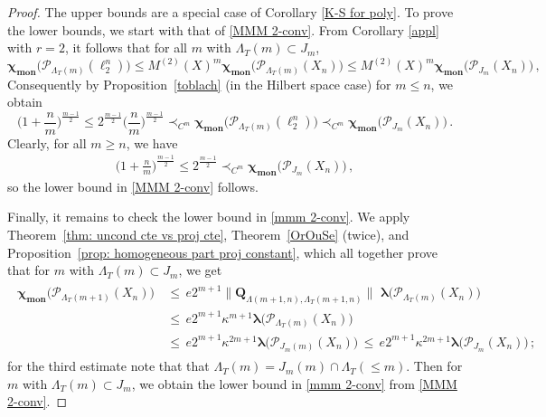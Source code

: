 \documentclass[12pt]{amsart}
\numberwithin{subsection}{section}
\theoremstyle{definition}
\theoremstyle{remark}
\DeclareMathOperator{\mon}{mon}
\newcommand{\chimon}{\chi_{\mon}}
\begin{document}
\begin{proof}
The upper bounds are a special case of Corollary \ref{K-S for poly}. To prove the lower bounds, we start with
that of \eqref{MMM 2-conv}.  From Corollary \ref{appl} with $r=2$, it follows that for all $m$
with $\Lambda_T(m) \subset J_m$,
\[
\boldsymbol{\chimon}\big(\mathcal{P}_{\Lambda_{T}(m)} (\ell_2^n)\big) \leq M^{(2)}(X)^m
\boldsymbol{\chimon}\big(\mathcal{P}_{\Lambda_{T}(m)}(X_n) \big) \leq M^{(2)}(X)^m \boldsymbol{\chimon}
\big(\mathcal{P}_{J_m}(X_n)\big)\,,
\]
Consequently by Proposition~\ref{toblach} (in the Hilbert space case) for $m\le n$, we obtain
\[
\Big( 1+ \frac{n}{m}\Big)^{\frac{m-1}{2}} \leq 2^{\frac{m-1}{2}} \Big(\frac{n}{m}\Big)^{\frac{m-1}{2}}
\prec_{C^m} \boldsymbol{\chimon} \big(\mathcal{P}_{\Lambda_T(m)}(\ell_2^n)\big) \prec_{C^m} \boldsymbol{\chimon}
\big(\mathcal{P}_{J_m}(X_n)\big)\,.
\]
Clearly, for all $m \ge n$, we have
\begin{align} \label{obvious}
\Big( 1+ \frac{n}{m}\Big)^{\frac{m-1}{2}} \leq 2^{\frac{m-1}{2}}  \prec_{C^m} \boldsymbol{\chimon}\big(\mathcal{P}_{J_m}(X_n)\big)\,,
\end{align}
so the lower bound in \eqref{MMM 2-conv} follows.


Finally, it remains to check the  lower bound in \eqref{mmm 2-conv}. We apply  Theorem~\ref{thm: uncond cte vs proj cte},
Theorem~\ref{OrOuSe} (twice), and  Proposition~\ref{prop: homogeneous part proj constant}, which all together prove that
for $m $ with $\Lambda_T(m) \subset J_m$, we get
\begin{align}\label{verflucht}
\begin{split}
\boldsymbol{\chimon}\big( \mathcal{P}_{\Lambda_T(m+1)}(X_n)\big) & \, \leq \,e 2^{m+1}
\|\mathbf{Q}_{\Lambda(m+1,n),\Lambda_T(m+1,n)}\|\,\, \boldsymbol{\lambda}\big( \mathcal{P}_{\Lambda_T(m)}(X_n)\big) \\
& \, \leq \,e 2^{m+1}  \kappa^{m+1} \boldsymbol{\lambda}\big( \mathcal{P}_{\Lambda_T(m)}(X_n)\big) \\
& \, \leq \,e 2^{m+1}  \kappa^{2m+1} \boldsymbol{\lambda}\big(\mathcal{P}_{J_m(m)}(X_n)\big)
\, \leq \,e 2^{m+1} \kappa^{2m+1} \boldsymbol{\lambda}\big(\mathcal{P}_{J_m}(X_n)\big)\,;
 \end{split}
\end{align}
for the third estimate note that that $\Lambda_T(m) = J_m(m)\cap  \Lambda_T(\leq m) $.
 Then for $m $ with $\Lambda_T(m) \subset J_m$, we obtain the lower bound in \eqref{mmm 2-conv} from
\eqref{MMM 2-conv}. 
\end{proof}
\end{document}
